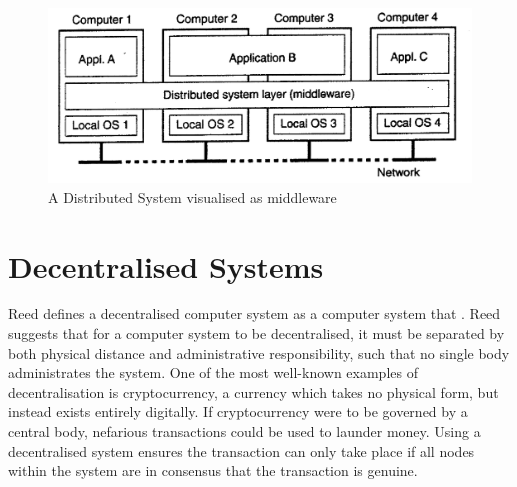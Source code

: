 \documentclass[a4paper, 11pt]{report}
\begin{document}
\begin{center}
	\begin{figure}[H]
		\includegraphics[width=\textwidth,keepaspectratio]{TanenbaumDistributed}
		\caption{A Distributed System visualised as \gls{middleware} \cite{tanenbaumdist}} 
		\label{fig:middleware}
	\end{figure}
\end{center}

\section{Decentralised Systems}
Reed defines a decentralised computer system as a computer system that  \cite{namingSyncDec}. Reed suggests that for a computer system to be decentralised, it must be separated by both physical distance and administrative responsibility, such that no single body administrates the system. One of the most well-known examples of decentralisation is \gls{cryptocurrency}, a currency which takes no physical form, but instead exists entirely digitally. If cryptocurrency were to be governed by a central body, nefarious transactions could be used to launder money. Using a decentralised system ensures the transaction can only take place if all nodes within the system are in consensus that the transaction is genuine.
\end{document}
